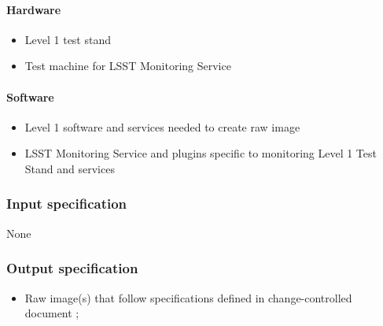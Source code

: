 \documentclass[DM,lsstdraft,STS,toc]{lsstdoc}
\begin{document}
\paragraph{Hardware}
\begin{itemize}
\item{Level 1 test stand}
\item{Test machine for LSST Monitoring Service}
\end{itemize}


\paragraph{Software}
\begin{itemize}
\item{Level 1 software and services needed to create raw image}
\item{LSST Monitoring Service and plugins specific to monitoring Level 1 Test Stand and services}
\end{itemize}


\subsubsection{Input specification}
None
\subsubsection{Output specification}
\begin{itemize}
\item{Raw image(s) that follow specifications defined in change-controlled document ;}
\end{itemize}
\end{document}
